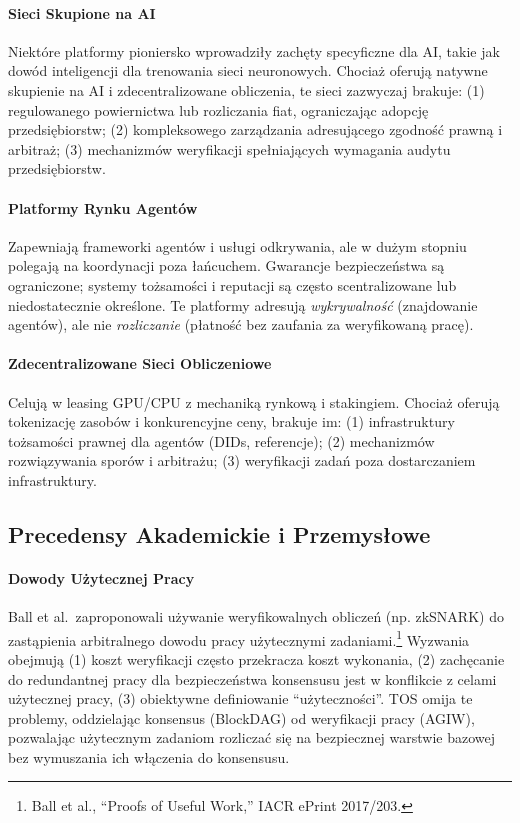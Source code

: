 \documentclass[11pt]{article}
\begin{document}
\paragraph{Sieci Skupione na AI} Niektóre platformy pioniersko wprowadziły zachęty specyficzne dla AI, takie jak dowód inteligencji dla trenowania sieci neuronowych. Chociaż oferują natywne skupienie na AI i zdecentralizowane obliczenia, te sieci zazwyczaj brakuje: (1) regulowanego powiernictwa lub rozliczania fiat, ograniczając adopcję przedsiębiorstw; (2) kompleksowego zarządzania adresującego zgodność prawną i arbitraż; (3) mechanizmów weryfikacji spełniających wymagania audytu przedsiębiorstw.

\paragraph{Platformy Rynku Agentów} Zapewniają frameworki agentów i usługi odkrywania, ale w dużym stopniu polegają na koordynacji poza łańcuchem. Gwarancje bezpieczeństwa są ograniczone; systemy tożsamości i reputacji są często scentralizowane lub niedostatecznie określone. Te platformy adresują \emph{wykrywalność} (znajdowanie agentów), ale nie \emph{rozliczanie} (płatność bez zaufania za weryfikowaną pracę).

\paragraph{Zdecentralizowane Sieci Obliczeniowe} Celują w leasing GPU/CPU z mechaniką rynkową i stakingiem. Chociaż oferują tokenizację zasobów i konkurencyjne ceny, brakuje im: (1) infrastruktury tożsamości prawnej dla agentów (DIDs, referencje); (2) mechanizmów rozwiązywania sporów i arbitrażu; (3) weryfikacji zadań poza dostarczaniem infrastruktury.

\subsection{Precedensy Akademickie i Przemysłowe}
\paragraph{Dowody Użytecznej Pracy} Ball et al.\ zaproponowali używanie weryfikowalnych obliczeń (np. zkSNARK) do zastąpienia arbitralnego dowodu pracy użytecznymi zadaniami.\footnote{Ball et al., ``Proofs of Useful Work,'' IACR ePrint 2017/203.} Wyzwania obejmują (1) koszt weryfikacji często przekracza koszt wykonania, (2) zachęcanie do redundantnej pracy dla bezpieczeństwa konsensusu jest w konflikcie z celami użytecznej pracy, (3) obiektywne definiowanie ``użyteczności''. TOS omija te problemy, oddzielając konsensus (BlockDAG) od weryfikacji pracy (AGIW), pozwalając użytecznym zadaniom rozliczać się na bezpiecznej warstwie bazowej bez wymuszania ich włączenia do konsensusu.
\end{document}

